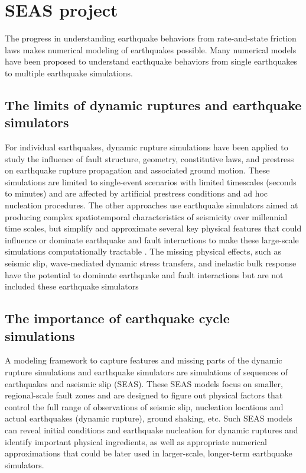 \section{SEAS project}
The progress in understanding earthquake behaviors from rate-and-state friction laws makes numerical modeling of earthquakes possible. Many numerical models have been proposed to understand earthquake behaviors from single earthquakes to multiple earthquake simulations.

\subsection{The limits of dynamic ruptures and earthquake simulators}
For individual earthquakes, dynamic rupture simulations have been applied to study the influence of fault structure, geometry, constitutive laws, and prestress on earthquake rupture propagation and associated ground motion.
These simulations are limited to single-event scenarios with limited timescales (seconds to minutes) and are affected by artificial prestress conditions and ad hoc nucleation procedures.
The other approaches use earthquake simulators aimed at producing complex spatiotemporal characteristics of seismicity over millennial time scales, but simplify and approximate several key physical features that could influence or dominate earthquake and fault interactions to make these large-scale simulations computationally tractable \citep{10.1785/0220120093}. 
The missing physical effects, such as seismic slip, wave-mediated dynamic stress transfers, and inelastic bulk response have the potential to dominate earthquake and fault interactions but are not included these earthquake simulators

\subsection{The importance of earthquake cycle simulations}
A modeling framework to capture features and missing parts of the dynamic rupture simulations and earthquake simulators are simulations of sequences of earthquakes and aseismic slip (SEAS).
These SEAS models focus on smaller, regional-scale fault zones and are designed to figure out physical factors that control the full range of observations of seismic slip, nucleation locations and actual earthquakes (dynamic rupture), ground shaking, etc.
Such SEAS models can reveal initial conditions and earthquake nucleation for dynamic ruptures and identify important physical ingredients, as well as appropriate numerical approximations that could be later used in larger-scale, longer-term earthquake simulators.

